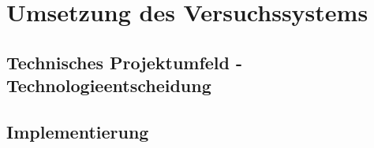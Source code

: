 \section{Umsetzung des Versuchssystems}
\subsection{Technisches Projektumfeld - Technologieentscheidung}
\subsection{Implementierung}
